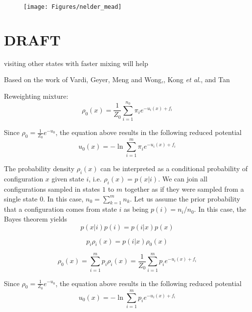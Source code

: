 \documentclass[aip,jcp,reprint,amsmath,amssymb]{revtex4-1}
\begin{document}
\begin{figure}
\centering
\texttt{[image: Figures/nelder\_mead]}
\caption{}
\label{fig:nelder_mead}
\end{figure}


\section{DRAFT}

visiting other states with faster mixing will help 

Based on the work of Vardi,\cite{Vardi_1985} Geyer,\cite{Geyer_1994} Meng and Wong,\cite{Meng_1996}, Kong \textit{et al}.\cite{Kong_2003}, and Tan\cite{Tan_2004}

Reweighting mixture\cite{Geyer_1994}:
\begin{equation*}
\rho_0(x) = \frac{1}{Z_0} \sum_{i=1}^{n_0} \pi_i e^{-u_i(x) + f_i}
\end{equation*}

Since $\rho_0 = \frac{1}{Z_0} e^{-u_0}$, the equation above results in the following reduced potential
\begin{equation}
\label{eq:mbar_reduced_potential}
u_0(x) = -\ln \sum_{i=1}^m \pi_i e^{-u_i(x) + f_i}
\end{equation}





The probability density $\rho_i(x)$ can be interpreted as a conditional probability of configuration $x$ given state $i$, i.e. $\rho_i(x) = p(x|i)$. We can join all configurations sampled in states $1$ to $m$ together as if they were sampled from a single state $0$. In this case, $n_0 = \sum_{k=1}^m n_k$. Let us assume the prior probability that a configuration comes from state $i$ as being $p(i) = n_i/n_0$. In this case, the Bayes theorem yields
\begin{equation*}
p(x|i) p(i) = p(i|x) p(x)
\end{equation*}

\begin{equation*}
p_i \rho_i(x) = p(i|x) \rho_0(x)
\end{equation*}

\begin{equation}
\label{eq:mbar_probability_density}
\rho_0(x) = \sum_{i=1}^m p_i \rho_i(x) = \frac{1}{Z_0} \sum_{i=1}^m p_i e^{-u_i(x) + f_i}
\end{equation}

Since $\rho_0 = \frac{1}{Z_0} e^{-u_0}$, the equation above results in the following reduced potential
\begin{equation}
\label{eq:mbar_reduced_potential}
u_0(x) = -\ln \sum_{i=1}^m p_i e^{-u_i(x) + f_i}
\end{equation}
\end{document}
